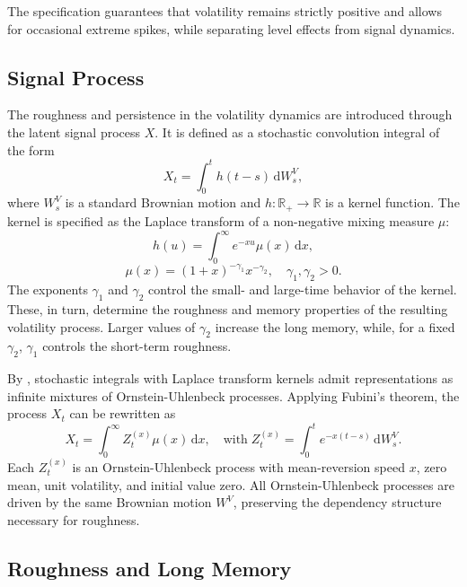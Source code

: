 The specification guarantees that volatility remains strictly positive and allows for occasional extreme spikes, while separating level effects from signal dynamics.


\subsection{Signal Process} \label{subsec: Signal Process}

The roughness and persistence in the volatility dynamics are introduced through the latent signal process $X$. It is defined as a stochastic convolution integral of the form
\begin{equation} \label{eq:StochInt}
    X_t = \int_0^t h(t-s) \, \mathrm{d}W_s^V,
\end{equation}
where $W_s^V$ is a standard Brownian motion and $h: \mathbb{R}_+ \to \mathbb{R}$ is a kernel function. The kernel is specified as the Laplace transform of a non-negative mixing measure $\mu$:
\begin{equation} \label{eq:Kernel}
    h(u) = \int_0^{\infty} e^{-x u} \mu(x) \, \mathrm{d}x,
\end{equation}
\begin{equation} \label{eq:Measure}
    \mu(x) = (1+x)^{-\gamma_1} x^{-\gamma_2}, \quad \gamma_1,\gamma_2 > 0.
\end{equation}
The exponents $\gamma_1$ and $\gamma_2$ control the small- and large-time behavior of the kernel. These, in turn, determine the roughness and memory properties of the resulting volatility process. Larger values of $\gamma_2$ increase the long memory, while, for a fixed $\gamma_2$, $\gamma_1$ controls the short-term roughness.

By \citet{CarmonaCoutin1998}, stochastic integrals with Laplace transform kernels admit representations as infinite mixtures of Ornstein-Uhlenbeck processes. Applying Fubini's theorem, the process $X_t$ can be rewritten as
\begin{equation} \label{eq:Signal}
    X_t = \int_0^{\infty} Z_t^{(x)} \mu(x) \, \mathrm{d}x, \quad \text{with}\; Z_t^{(x)} = \int_0^t e^{-x(t-s)} \, \mathrm{d}W_s^V.
\end{equation}
Each $Z_t^{(x)}$ is an Ornstein-Uhlenbeck process with mean-reversion speed $x$, zero mean, unit volatility, and initial value zero. All Ornstein-Uhlenbeck processes are driven by the same Brownian motion $W^V$, preserving the dependency structure necessary for roughness.


\subsection{Roughness and Long Memory} \label{subsec: Roughness and Long Memory}

